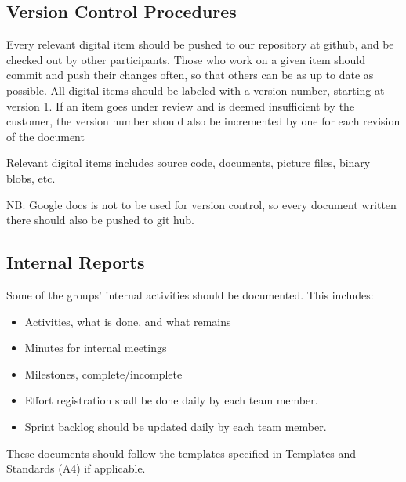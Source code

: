 \subsection{Version Control Procedures}
Every relevant digital item should be pushed to our \gls{repository} at github, and be checked out by other participants. Those who work on a given item should commit and push their changes often, so that others can be as up to date as possible. All digital items should be labeled with a version number, starting at version 1. If an item goes under review and is deemed insufficient by the customer, the version number should also be incremented by one for each revision of the document

Relevant digital items includes source code, documents, picture files, binary blobs, etc.

NB: Google docs is not to be used for version control, so every document written there should also be pushed to git hub.

\subsection{Internal Reports}
Some of the groups' internal activities should be documented. This includes:
\begin{itemize}
	\item Activities, what is done, and what remains
	\item Minutes for internal meetings
	\item Milestones, complete/incomplete
	\item Effort registration shall be done daily by each team member.
	\item Sprint backlog should be updated daily by each team member.
\end{itemize}
These documents should follow the templates specified in Templates and Standards (A4) if applicable.


